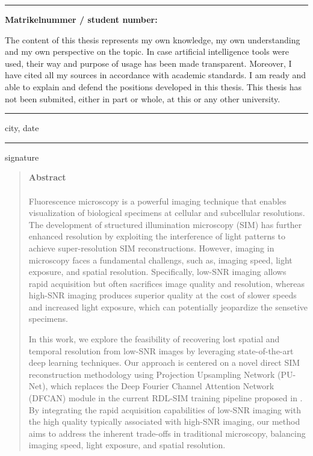 \documentclass[11pt,
  paper=a4, 
  bibliography=totocnumbered,
	captions=tableheading,
	BCOR=10mm
]{scrreprt}
\theoremstyle{definition}
\newcommand{\namesigdate}[1][5cm]{%
	\vspace{5cm}
	{\setlength{\parindent}{0cm}
	\begin{minipage}{0.3\textwidth}
		\hrule 
		\vspace{0.5cm}
		{\small city, date}
	\end{minipage}
	 \hfill
	\begin{minipage}{0.3\textwidth}
		\hrule
		\vspace{0.5cm}
	    {\small signature}
	\end{minipage}
	}
}
\begin{document}
\noindent
\rule{\textwidth}{0.2pt} %
\vspace{0.2cm} %
\textbf{Matrikelnummer / student number:} \\[0.2cm]
\vspace{0.5cm}


\noindent
The content of this thesis represents my own knowledge, my own understanding and my own 
perspective on the topic. In case artificial intelligence tools were used, their way and purpose 
of usage has been made transparent. Moreover, I have cited all my sources in accordance with 
academic standards. I am ready and able to explain and defend the positions developed in this 
thesis. This thesis has not been submited, either in part or whole, at this or any other 
university. 



\namesigdate
{}
\pagebreak






\begin{abstract}
	\textbf{\LARGE{Abstract}}\\\\
Fluorescence microscopy is a powerful imaging technique that enables visualization of biological specimens at 
cellular and subcellular resolutions. The development of structured illumination microscopy (SIM) has further enhanced 
resolution by exploiting the interference of light patterns to achieve super-resolution SIM reconstructions. However, imaging in
microscopy faces a fundamental challengs, such as, imaging speed, light exposure, and spatial resolution. 
Specifically, low-SNR imaging allows rapid acquisition but often sacrifices image quality and resolution,
 whereas high-SNR imaging produces superior quality at the cost of slower speeds and increased light exposure, 
 which can potentially jeopardize the sensetive specimens.

 \vspace{1cm}
 \noindent
 In this work, we explore the feasibility of recovering lost spatial and temporal resolution from low-SNR images 
 by leveraging state-of-the-art deep learning techniques. Our approach is centered on a novel direct 
 SIM reconstruction methodology using Projection Upsampling Network (PU-Net), which replaces the Deep Fourier Channel Attention Network (DFCAN) module in the current RDL-SIM 
 training pipeline proposed in \cite{rdl_main}. By integrating the rapid acquisition capabilities of low-SNR imaging 
 with the high quality typically associated with high-SNR imaging, our method aims to address the inherent trade-offs 
 in traditional microscopy, balancing imaging speed, light exposure, and spatial resolution.
 
 
\end{abstract}
\end{document}
